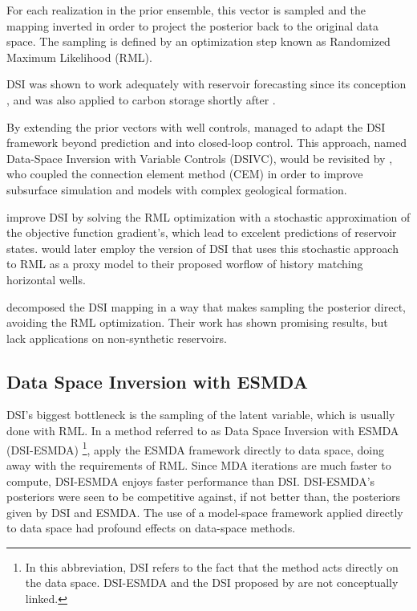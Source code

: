     For each realization in the prior ensemble, 
    this vector is sampled and the mapping inverted in order to 
    project the posterior back to the original data space.
    The sampling is defined by an optimization step known as Randomized Maximum Likelihood (RML).

    DSI was shown to work adequately with reservoir forecasting since its conception
    \cite{Sun:2017:A, Sun:2017:B},
    and was also applied to carbon storage shortly after
    \cite{Sun:2019}.
    
    By extending the prior vectors with well controls, 
     managed to adapt the DSI framework beyond prediction and into closed-loop control.
    This approach, named Data-Space Inversion with Variable Controls (DSIVC),
    would be revisited by
    ,
    who coupled the connection element method (CEM) 
    in order to improve subsurface simulation and models with complex geological formation. 

     improve DSI by solving the RML optimization with
    a stochastic approximation of the objective function gradient's, 
    which lead to excelent predictions of reservoir states.
     would later employ the version of DSI that uses this stochastic approach to RML
    as a proxy model to their proposed worflow of history matching horizontal wells.  
    
     decomposed the DSI mapping 
    in a way that makes sampling the posterior direct, avoiding the RML optimization. 
    Their work has shown promising results, but lack applications on non-synthetic reservoirs.
    
\subsection{Data Space Inversion with ESMDA}
    DSI's biggest bottleneck is the sampling of the latent variable, which is usually done with RML. 
    In a method referred to as Data Space Inversion with ESMDA (DSI-ESMDA)%
    \footnote{%
        In this abbreviation, DSI refers to the fact that the method acts directly on the data space.
        DSI-ESMDA and the DSI proposed by \cite{Sun:2017:A} are not conceptually linked.
    },
     apply the ESMDA framework directly to data space, 
    doing away with the requirements of RML.
    Since MDA iterations are much faster to compute, DSI-ESMDA enjoys faster performance than DSI.
    DSI-ESMDA's posteriors were seen to be competitive against, if not better than,
    the posteriors given by DSI and ESMDA.
    The use of a model-space framework applied directly to data space had profound effects on data-space methods. 

